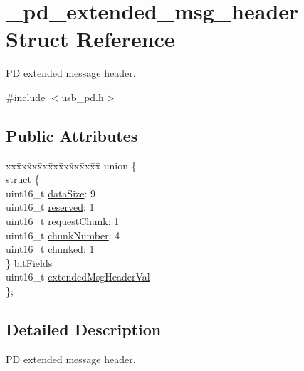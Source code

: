 \hypertarget{struct__pd__extended__msg__header}{\section{\-\_\-pd\-\_\-extended\-\_\-msg\-\_\-header Struct Reference}
\label{struct__pd__extended__msg__header}
}


P\-D extended message header.  




{\ttfamily \#include $<$usb\-\_\-pd.\-h$>$}

\subsection*{Public Attributes}
\begin{DoxyCompactItemize}
\item 
\begin{tabbing}
xx\=xx\=xx\=xx\=xx\=xx\=xx\=xx\=xx\=\kill
union \{\\
\>struct \{\\
\>\>uint16\_t \hyperlink{struct__pd__extended__msg__header_a2de7ab0aad3f2a5d43ac2fab21faa472}{dataSize}: 9\\
\>\>uint16\_t \hyperlink{struct__pd__extended__msg__header_a8480a71ff4037e27738e81c01dfd6b0d}{reserved}: 1\\
\>\>uint16\_t \hyperlink{struct__pd__extended__msg__header_a56118ebd135557a535235ec18d34eea8}{requestChunk}: 1\\
\>\>uint16\_t \hyperlink{struct__pd__extended__msg__header_a7d9849b0fd8f87888a54bca2df9c1aa5}{chunkNumber}: 4\\
\>\>uint16\_t \hyperlink{struct__pd__extended__msg__header_a7ddec1cf6746143e515ead70b6cbc854}{chunked}: 1\\
\>\} \hyperlink{struct__pd__extended__msg__header_aac756f1b65823f59184919281e17c0ce}{bitFields}\\
\>uint16\_t \hyperlink{struct__pd__extended__msg__header_a1d247099ea671c66798b32e603697c5d}{extendedMsgHeaderVal}\\
\}; \\

\end{tabbing}\end{DoxyCompactItemize}


\subsection{Detailed Description}
P\-D extended message header. 

